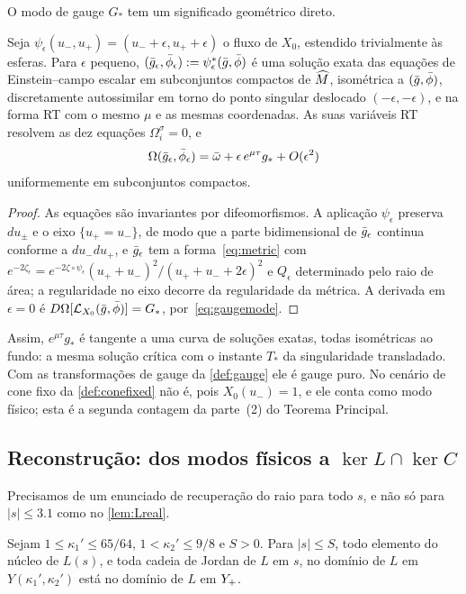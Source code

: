 O modo de gauge $G_*$ tem um significado geométrico direto.

\begin{lemma}[O cone]\label{lem:cone}
Seja $\psi_\epsilon(u_-,u_+)=(u_-+\epsilon,u_++\epsilon)$ o fluxo de $X_0$, estendido trivialmente às
esferas. Para $\epsilon$ pequeno, $(\bar g_\epsilon,\bar\phi_\epsilon):=\psi_\epsilon^*(\bar g,\bar\phi)$ é uma solução
exata das equações de Einstein--campo escalar em subconjuntos compactos de $\widehat M$, isométrica a
$(\bar g,\bar\phi)$, discretamente autossimilar em torno do ponto singular deslocado $(-\epsilon,-\epsilon)$, e na forma
RT com o mesmo $\mu$ e as mesmas coordenadas. As suas variáveis RT resolvem as dez equações $\Omega_i^\sigma=0$, e
\[
  \Omega(\bar g_\epsilon,\bar\phi_\epsilon)=\bar\omega+\epsilon\,e^{\mu\tau}g_*+O(\epsilon^2)
\]
uniformemente em subconjuntos compactos.
\end{lemma}

\begin{proof}
As equações são invariantes por difeomorfismos. A aplicação $\psi_\epsilon$ preserva $du_\pm$ e o eixo
$\{u_+=u_-\}$, de modo que a parte bidimensional de $\bar g_\epsilon$ continua conforme a $du_-du_+$, e
$\bar g_\epsilon$ tem a forma~\eqref{eq:metric} com $e^{-2\zeta_\epsilon}=e^{-2\zeta\circ\psi_\epsilon}
(u_++u_-)^2/(u_++u_-+2\epsilon)^2$ e $Q_\epsilon$ determinado pelo raio de área; a regularidade no eixo
decorre da regularidade da métrica. A derivada em $\epsilon=0$ é
$D\Omega[\mathcal{L}_{X_0}(\bar g,\bar\phi)]=G_*$, por~\eqref{eq:gaugemode}.
\end{proof}

Assim, $e^{\mu\tau}g_*$ é tangente a uma curva de soluções exatas, todas isométricas ao fundo: a mesma
solução crítica com o instante $T_*$ da singularidade transladado. Com as transformações de gauge da
\cref{def:gauge} ele é gauge puro. No cenário de cone fixo da \cref{def:conefixed} não é, pois $X_0(u_-)=1$, e ele
conta como modo físico; esta é a segunda contagem da parte~(2) do Teorema Principal.

\subsection{Reconstrução: dos modos físicos a $\ker L\cap\ker C$}\label{sec:physical-forward}

Precisamos de um enunciado de recuperação do raio para todo $s$, e não só para $|s|\le3.1$ como no \cref{lem:Lreal}.

\begin{lemma}\label{lem:recovery}
Sejam $1\le\kappa_1'\le65/64$, $1<\kappa_2'\le9/8$ e $S>0$. Para $|s|\le S$, todo elemento do núcleo de
$L(s)$, e toda cadeia de Jordan de $L$ em $s$, no domínio de $L$ em $Y(\kappa_1',\kappa_2')$ está no
domínio de $L$ em $Y_{+}$.
\end{lemma}

